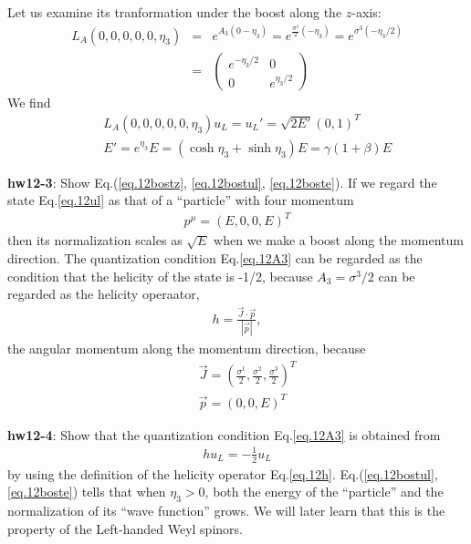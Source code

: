 \documentclass[12pt]{article}
\begin{document}
  Let us examine its tranformation under the boost along the $z$-axis:
\begin{eqnarray}
  L_A(0,0,0,0,0,\eta_3)
  &=& e^{ A_3       (0-\eta_3) }
  = e^{ \frac{\sigma^3}{2} (-\eta_3) }
  = e^{ \sigma^3 (-\eta_3/2) } \\
  &=&
  \begin{pmatrix}
    e^{-\eta_3/2} & 0 \\
    0 & e^{\eta_3/2}
  \end{pmatrix} \label{eq.12bostz}
\end{eqnarray}
   We find
\begin{eqnarray}
  &&L_A(0,0,0,0,0,\eta_3) u_L = u_L' = \sqrt{2E'} (0,1)^T \label{eq.12bostul} \\ 
  &&E' = e^{\eta_3} E = (\cosh\eta_3 + \sinh\eta_3) E = \gamma(1+\beta) E \label{eq.12boste}
\end{eqnarray}

{\bf hw12-3}: Show Eq.(\ref{eq.12bostz}, \ref{eq.12bostul}, \ref{eq.12boste}).
  If we regard the state Eq.\ref{eq.12ul} as that of a ``particle'' with four momentum
\begin{eqnarray}
  p^\mu = (E, 0, 0, E)^T \label{eq.12pu}
\end{eqnarray}
  then its normalization scales as $\sqrt{E}$ when we make a boost along
  the momentum direction. The quantization condition Eq.\ref{eq.12A3} can be
  regarded as the condition that the helicity of the state is -1/2,
  because $A_3 = \sigma^3/2$ can be regarded as the helicity operaator,
\begin{eqnarray}
  h = \frac {\vec{J} \cdot \vec{p}}{|\vec{p}|}, \label{eq.12h}
\end{eqnarray}
  the angular momentum along the momentum direction, because
\begin{eqnarray}
  &&\vec{J} = (\frac{\sigma^1}{2}, \frac{\sigma^2}{2}, \frac{\sigma^3}{2})^T \label{eq.12agm} \\  &&\vec{p} = ( 0, 0, E )^T
\end{eqnarray}
 
{\bf hw12-4}: Show that the quantization condition Eq.\ref{eq.12A3} is obtained from
\begin{eqnarray}
  h u_L = -\frac{1}{2} u_L \label{eq.12_69}
\end{eqnarray}
 by using the definition of the helicity operator Eq.\ref{eq.12h}. Eq.(\ref{eq.12bostul}, \ref{eq.12boste}) tells that when $\eta_3 > 0$, both the energy of the ``particle''
  and the normalization of its ``wave function'' grows.  We will later
  learn that this is the property of the Left-handed Weyl spinors.
\end{document}
